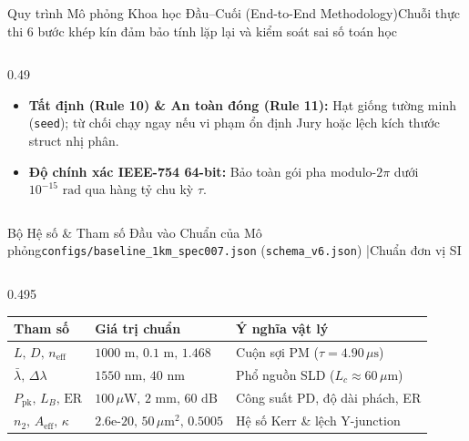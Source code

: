 \documentclass[aspectratio=169,8pt]{beamer}
\begin{document}
\begin{frame}{Quy trình Mô phỏng Khoa học Đầu–Cuối (End-to-End Methodology)}{Chuỗi thực thi 6 bước khép kín đảm bảo tính lặp lại và kiểm soát sai số toán học}
\begin{columns}[T]
\begin{column}{0.49\textwidth}
\begin{remarkbox}
\begin{itemize}
        \item \textbf{Tất định (Rule 10) \& An toàn đóng (Rule 11):} Hạt giống tường minh (\texttt{seed}); từ chối chạy ngay nếu vi phạm ổn định Jury hoặc lệch kích thước struct nhị phân.
        \item \textbf{Độ chính xác IEEE-754 64-bit:} Bảo toàn gói pha modulo-$2\pi$ dưới $10^{-15}\text{ rad}$ qua hàng tỷ chu kỳ $\tau$.
      \end{itemize}
    \end{remarkbox}
  \end{column}
\end{columns}
\end{frame}

\begin{frame}{Bộ Hệ số \& Tham số Đầu vào Chuẩn của Mô phỏng}{\texttt{configs/baseline\_1km\_spec007.json} (\texttt{schema\_v6.json}) \enspace|\enspace Chuẩn đơn vị SI}
\begin{columns}[T]
  \begin{column}{0.495\textwidth}
    \begin{eqbox}
      \tiny\setlength{\tabcolsep}{2.2pt}\renewcommand{\arraystretch}{1.16}
      \begin{tabularx}{\linewidth}{@{}p{1.48cm} p{2.32cm} >{\raggedright\arraybackslash}X@{}}
        \textbf{Tham số} & \textbf{Giá trị chuẩn} & \textbf{Ý nghĩa vật lý} \\
        \midrule
        $L,\,D,\,n_{\text{eff}}$ & $1000\text{ m},\,0.1\text{ m},\,1.468$ & Cuộn sợi PM ($\tau=4.90\,\mu\text{s}$) \\
        $\bar{\lambda},\,\Delta\lambda$ & $1550\text{ nm},\,40\text{ nm}$ & Phổ nguồn SLD ($L_c\approx 60\,\mu\text{m}$) \\
        $P_{\text{pk}},\,L_B,\,\text{ER}$ & $100\,\mu\text{W},\,2\text{ mm},\,60\text{ dB}$ & Công suất PD, độ dài phách, ER \\
        $n_2,\,A_{\text{eff}},\,\kappa$ & $2.6\text{e-}20,\,50\,\mu\text{m}^2,\,0.5005$ & Hệ số Kerr \& lệch Y-junction \\
      \end{tabularx}
    \end{eqbox}
    \vspace{0.10cm}
    \begin{eqbox}
      \tiny\setlength{\tabcolsep}{2.2pt}\renewcommand{\arraystretch}{1.16}

\end{eqbox}
\end{column}
\end{columns}
\end{frame}
\end{document}
